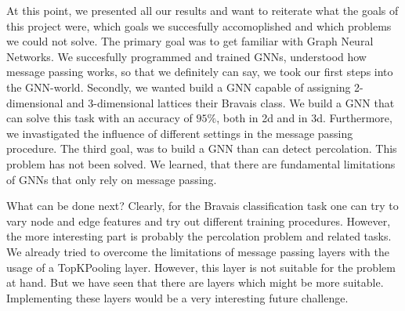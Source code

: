 At this point, we presented all our results and want to reiterate what the 
goals of this project were, which goals we succesfully accomoplished and which 
problems we could not solve.
The primary goal was to get familiar with Graph Neural Networks. 
We succesfully programmed and trained GNNs, understood how message passing works, so that we definitely can say, we took our 
first steps into the GNN-world. Secondly, we wanted build a GNN capable of assigning 2-dimensional and
3-dimensional lattices their Bravais class. We build a GNN that can solve this task with an accuracy of $95\%$, both in 2d and in 3d.
Furthermore, we invastigated the influence of different settings in the message passing procedure. 
The third goal, was to build a GNN than can detect percolation. This problem has not been solved.
We learned, that there are fundamental limitations of GNNs that only rely on message passing.

What can be done next? 
Clearly, for the Bravais classification task one can try to vary node and edge features and try out different training procedures.
However, the more interesting part is probably the percolation problem and related tasks. We already tried to overcome the
limitations of message passing layers with the usage of a TopKPooling layer. However, this layer is not suitable
for the problem at hand. But we have seen that there are layers which might be more suitable. 
Implementing these layers would be a very interesting future challenge.
